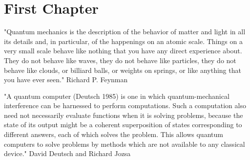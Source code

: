 \chapter{First Chapter}

\begin{displayquote}
    "Quantum mechanics is the description of the behavior of matter and light in all its details and, in particular, of the happenings on an atomic scale. Things on a very small scale behave like nothing that you have any direct experience about. They do not behave like waves, they do not behave like particles, they do not behave like clouds, or billiard balls, or weights on springs, or like anything that you have ever seen."  Richard P. Feynman \cite{Feynman_Leighton_Sands_1966}
\end{displayquote}

\begin{displayquote}
"A quantum computer (Deutsch 1985) is one in which quantum-mechanical interference can be harnessed to perform computations. Such a computation also need not necessarily evaluate functions when it is solving problems, because the state of its output might be a coherent superposition of states corresponding to different answers, each of which solves the problem. This allows quantum computers to solve problems by methods which are not available to any classical device." David Deutsch and Richard Jozsa \cite{deutsch1992rapid}
\end{displayquote}

